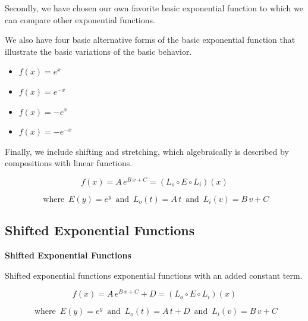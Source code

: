 \documentclass{ximera}
\begin{document}
\begin{template}
Secondly, we have chosen our own favorite basic exponential function to which we can compare other exponential functions.

We also have four basic alternative forms of the basic exponential function that illustrate the basic variations of the basic behavior.

\begin{itemize}
\item $f(x) = e^x$ 
\item $f(x) = e^{-x}$ 
\item $f(x) = -e^x$ 
\item $f(x) = -e^{-x}$ 
\end{itemize}






Finally, we include shifting and stretching, which algebraically is described by compositions with linear functions.


\[ f(x) = A \, e^{B \, x + C} = (L_o \circ E \circ L_i)(x) \]

\[
\text{ where } \,  E(y) = e^y   \,  \text{ and } \,   L_o(t) = A \, t    \,  \text{ and } \,   L_i(v) = B \, v + C
\]








\end{template}










\subsection*{Shifted Exponential Functions}










\begin{template}  \textbf{\textcolor{blue!55!black}{Shifted Exponential Functions}} 


Shifted exponential functions exponential functions with an added constant term.


\[ f(x) = A \, e^{B \, x + C} + D = (L_o \circ E \circ L_i)(x) \]

\[
\text{ where } \,  E(y) = e^y   \,  \text{ and } \,   L_o(t) = A \, t + D  \,  \text{ and } \,   L_i(v) = B \, v + C
\]





\end{template}
\end{document}
